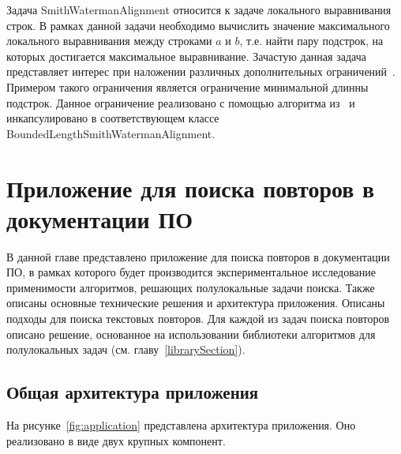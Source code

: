 Задача SmithWatermanAlignment относится к задаче локального выравнивания строк.
В рамках данной задачи необходимо вычислить значение максимального локального выравнивания между строками $a$ и $b$, т.е. найти пару подстрок, на которых достигается максимальное выравнивание.
Зачастую данная задача представляет интерес при наложении различных дополнительных ограничений~\cite{arslan2004dynamic}.
Примером такого ограничения является ограничение минимальной длинны подстрок.
Данное ограничение реализовано с помощью алгоритма из~\cite{tiskin2019bounded} и инкапсулировано в соответствующем классе BoundedLengthSmithWatermanAlignment.




\section{Приложение для поиска повторов в документации ПО}\label{searchPO}
В данной главе представлено приложение для поиска повторов в документации ПО, в рамках которого будет производится экспериментальное исследование применимости алгоритмов, решающих полулокальные задачи поиска.
Также описаны основные технические решения и архитектура приложения.
Описаны подходы для поиска текстовых повторов.
Для каждой из задач поиска повторов описано решение, основанное на использовании библиотеки алгоритмов для полулокальных задач (см. главу~\ref{librarySection}).



\subsection{Общая архитектура приложения}
На рисунке~\ref{fig:application} представлена архитектура приложения.
Оно реализовано в виде двух крупных компонент.

